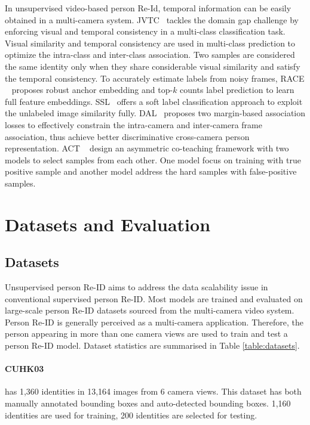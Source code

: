 \documentclass[a4paper,fleqn]{cas-dc}
\begin{document}
In unsupervised video-based person Re-Id, temporal information can be easily obtained in a multi-camera system. JVTC~\cite{vedaldi_joint_2020-1} tackles the domain gap challenge by enforcing visual and temporal consistency in a multi-class classification task. Visual similarity and temporal consistency are used in multi-class prediction to optimize the intra-class and inter-class association. Two samples are considered the same identity only when they share considerable visual similarity and satisfy the temporal consistency. To accurately estimate labels from noisy frames, RACE ~\cite{ye_robust_2018} proposes robust anchor embedding and top-$k$ counts label prediction to learn full feature embeddings. SSL~\cite{lin_unsupervised_2020} offers a soft label classification approach to exploit the unlabeled image similarity fully. DAL~\cite{chen_deep_2018} proposes two margin-based association losses to effectively constrain the intra-camera and inter-camera frame association, thus achieve better discriminative cross-camera person representation. ACT ~\cite{yang_asymmetric_2020} design an asymmetric co-teaching framework with two models to select samples from each other. One model focus on training with true positive sample and another model address the hard samples with false-positive samples. 



\section{Datasets and Evaluation}\label{evaluation}
\subsection{Datasets}
Unsupervised person Re-ID aims to address the data scalability issue in conventional supervised person Re-ID. Most models are trained and evaluated on large-scale person Re-ID datasets sourced from the multi-camera video system. Person Re-ID is generally perceived as a multi-camera application. Therefore, the person appearing in more than one camera views are used to train and test a person Re-ID model. Dataset statistics are summarised in Table \ref{table:datasets}.   

\paragraph{CUHK03~\cite{li_deepreid_2014}} has 1,360 identities in 13,164 images from 6 camera views. This dataset has both manually annotated bounding boxes and auto-detected bounding boxes. 1,160 identities are used for training, 200 identities are selected for testing.
\end{document}
